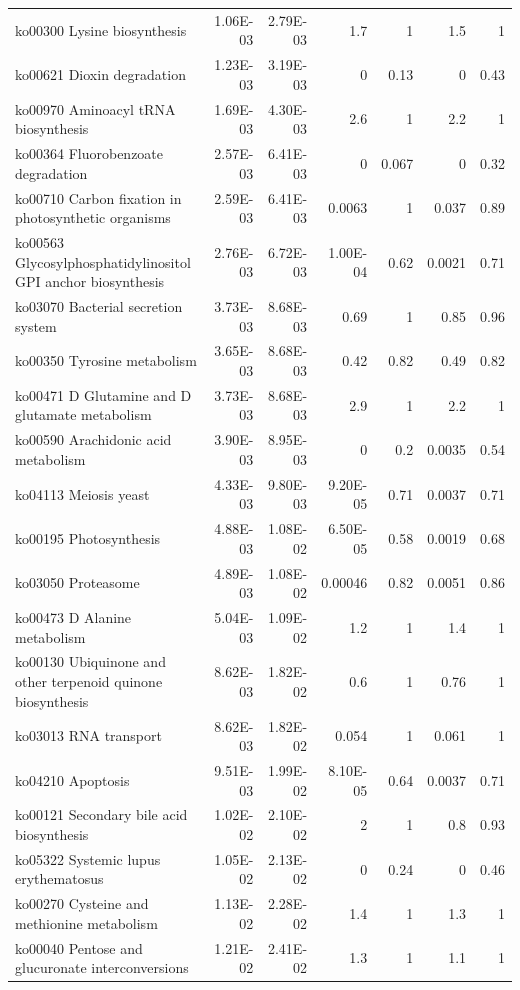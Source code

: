 {\begin{longtable}{ | l | r | r | r | r | r | r  | }
		ko00300 Lysine biosynthesis & 1.06E-03 & 2.79E-03 & 1.7 & 1 & 1.5 & 1 \\ 
		ko00621 Dioxin degradation & 1.23E-03 & 3.19E-03 & 0 & 0.13 & 0 & 0.43 \\ 
		ko00970 Aminoacyl tRNA biosynthesis & 1.69E-03 & 4.30E-03 & 2.6 & 1 & 2.2 & 1 \\ 
		ko00364 Fluorobenzoate degradation & 2.57E-03 & 6.41E-03 & 0 & 0.067 & 0 & 0.32 \\ 
		ko00710 Carbon fixation in photosynthetic organisms & 2.59E-03 & 6.41E-03 & 0.0063 & 1 & 0.037 & 0.89 \\ 
		ko00563 Glycosylphosphatidylinositol GPI anchor biosynthesis & 2.76E-03 & 6.72E-03 & 1.00E-04 & 0.62 & 0.0021 & 0.71 \\ 
		ko03070 Bacterial secretion system & 3.73E-03 & 8.68E-03 & 0.69 & 1 & 0.85 & 0.96 \\ 
		ko00350 Tyrosine metabolism & 3.65E-03 & 8.68E-03 & 0.42 & 0.82 & 0.49 & 0.82 \\ 
		ko00471 D Glutamine and D glutamate metabolism & 3.73E-03 & 8.68E-03 & 2.9 & 1 & 2.2 & 1 \\ 
		ko00590 Arachidonic acid metabolism & 3.90E-03 & 8.95E-03 & 0 & 0.2 & 0.0035 & 0.54 \\ 
		ko04113 Meiosis yeast & 4.33E-03 & 9.80E-03 & 9.20E-05 & 0.71 & 0.0037 & 0.71 \\ 
		ko00195 Photosynthesis & 4.88E-03 & 1.08E-02 & 6.50E-05 & 0.58 & 0.0019 & 0.68 \\ 
		ko03050 Proteasome & 4.89E-03 & 1.08E-02 & 0.00046 & 0.82 & 0.0051 & 0.86 \\ 
		ko00473 D Alanine metabolism & 5.04E-03 & 1.09E-02 & 1.2 & 1 & 1.4 & 1 \\ 
		ko00130 Ubiquinone and other terpenoid quinone biosynthesis & 8.62E-03 & 1.82E-02 & 0.6 & 1 & 0.76 & 1 \\ 
		ko03013 RNA transport & 8.62E-03 & 1.82E-02 & 0.054 & 1 & 0.061 & 1 \\ 
		ko04210 Apoptosis & 9.51E-03 & 1.99E-02 & 8.10E-05 & 0.64 & 0.0037 & 0.71 \\ 
		ko00121 Secondary bile acid biosynthesis & 1.02E-02 & 2.10E-02 & 2 & 1 & 0.8 & 0.93 \\ 
		ko05322 Systemic lupus erythematosus & 1.05E-02 & 2.13E-02 & 0 & 0.24 & 0 & 0.46 \\ 
		ko00270 Cysteine and methionine metabolism & 1.13E-02 & 2.28E-02 & 1.4 & 1 & 1.3 & 1 \\ 
		ko00040 Pentose and glucuronate interconversions & 1.21E-02 & 2.41E-02 & 1.3 & 1 & 1.1 & 1 \\ 

\end{longtable}}

